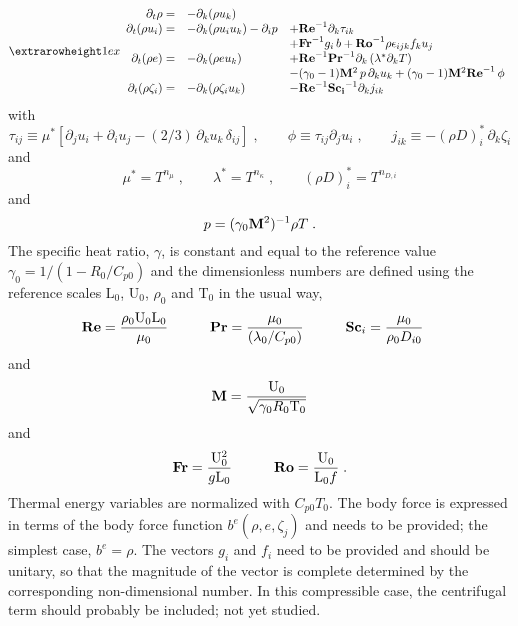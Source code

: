 \begin{equation}
\setlength{\extrarowheight}{1ex}
\begin{array}{rll}
  \partial_t \rho =&
  -\partial_k (\rho u_k)  & \\
  \partial_t (\rho u_i) =& 
  -\partial_k (\rho u_i u_k )- \partial_i p &
  +\mathrm{\bf Re}^{-1}\partial_k \tau_{ik}\\
  & & +\mathrm{\bf Fr}^{-1} g_i\,b+\mathrm{\bf Ro}^{-1}\rho\epsilon_{ijk} f_ku_j  \\
  \partial_t (\rho e) =& 
  -\partial_k (\rho e u_k ) &
  +\mathrm{\bf Re}^{-1}\mathrm{\bf Pr}^{-1} \partial_k \left(\lambda^{*} \partial_k T\right) \\
  & &-(\gamma_0-1)\mathrm{\bf M}^2\,p\, \partial_k u_k  + (\gamma_0-1)\mathrm{\bf M}^2\mathrm{\bf Re}^{-1}\,\phi \\
  \partial_t (\rho \zeta_i)=&
  -\partial_k (\rho \zeta_i u_k) &
  - \mathrm{\bf Re}^{-1}\mathrm{\bf Sc_i}^{-1} \partial_k j_{ik}
\end{array}
\end{equation}
with
\begin{equation}
  \tau_{ij} \equiv  \mu^*\left[\partial_j u_i +  \partial_i u_j - 
  (2/3)\, \partial_k u_k\,\delta_{ij}\right]\;,\qquad
  \phi \equiv \tau_{ij} \partial_j u_i\;,\qquad
  j_{ik}  \equiv -(\rho D)_i^{*}\, \partial_k \zeta_i
\end{equation}
and
\begin{equation}
  \mu^{*} =  T^{n_\mu}\;,\qquad \lambda^{*} = T^{n_\kappa} \;,\qquad (\rho D)_i^{*}  =  T^{n_{D,i}}
\end{equation}
and
\begin{equation}
  p  = (\gamma_0 \mathrm{\bf M}^2)^{-1}\rho T \;.
  \label{eq:state}
\end{equation}
The specific heat ratio, $\gamma$, is constant and equal to the reference value $\gamma_0=1/(1-R_0/C_{p0})$ and the dimensionless numbers are defined using the reference scales $\mathrm{L}_0$, $\mathrm{U}_0$, $\rho_0$ and $\mathrm{T}_0$ in the usual way,
\begin{alignat*}{3}
  \mathrm{\bf Re} & = \frac{\rho_0 \mathrm{U}_0 \mathrm{L}_0}{\mu_0} & \qquad 
  \mathrm{\bf Pr} & = \frac{\mu_0}{(\lambda_0/C_{p0})} & \qquad
  \mathrm{\bf Sc}_i & = \frac{\mu_0}{\rho_0 D_{i0}} 
\end{alignat*}
and
\begin{equation*}
  \mathrm{\bf M}  = \frac{\mathrm{U}_0}{\sqrt{\gamma_0 R_0 \mathrm{T}_0}} 
\end{equation*}
and
\begin{alignat*}{2}
\mathrm{\bf Fr} & = \frac{\mathrm{U}_0^2}{g\mathrm{L}_0} & \qquad \mathrm{\bf
  Ro} = \frac{\mathrm{U}_0}{\mathrm{L}_0f} \;.
\end{alignat*}
Thermal energy variables are normalized with $C_{p0}T_0$. The body force is expressed in terms of the body force function $b^e(\rho,e,\zeta_j)$ and needs to be provided; the simplest case, $b^e=\rho$. The vectors $g_i$ and $f_i$ need to be provided and should be unitary, so that the magnitude of the vector is complete determined by the corresponding non-dimensional number. In this compressible case, the centrifugal term should probably be included; not yet studied.

